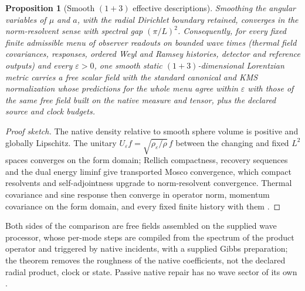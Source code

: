 \documentclass[11pt]{article}
\newtheorem{proposition}[theorem]{Proposition}
\theoremstyle{definition}
\theoremstyle{remark}
\begin{document}
\begin{proposition}[Smooth $(1+3)$ effective descriptions]
\label{prop:effective-lorentzian}
Smoothing the angular variables of $\mu$ and $a$, with the radial Dirichlet
boundary retained, converges in the norm-resolvent sense with spectral gap
$(\pi/L)^2$. Consequently, for every fixed finite admissible menu of
observer readouts on bounded wave times (thermal field covariances, responses,
ordered Weyl and Ramsey histories, detector and reference outputs) and every
$\varepsilon>0$, one smooth static $(1+3)$-dimensional Lorentzian metric
carries a free scalar field with the standard canonical and KMS normalization
whose predictions for the whole menu agree within $\varepsilon$ with those of
the same free field built on the native measure and tensor, plus the declared
source and clock budgets.
\end{proposition}

\begin{proof}[Proof sketch]
The native density relative to smooth sphere volume is positive and globally
Lipschitz. The unitary $U_\varepsilon f=\sqrt{\rho_\varepsilon/\rho}\,f$
between the changing and fixed $L^2$ spaces converges on the form domain;
Rellich compactness, recovery sequences and the dual energy liminf give
transported Mosco convergence, which compact resolvents and
self-adjointness upgrade to norm-resolvent convergence. Thermal covariance
and sine response then converge in operator norm, momentum covariance on the
form domain, and every fixed finite history with them
\cite{ophspine,mosco1994}.
\end{proof}

Both sides of the comparison are free fields assembled on the supplied
wave processor, whose per-mode steps are compiled from the spectrum of the
product operator and triggered by native incidents, with a supplied Gibbs
preparation; the theorem removes the roughness of the native coefficients,
not the declared radial product, clock or state. Passive native repair has
no wave sector of its own \cite{ophspine}.
\end{document}
